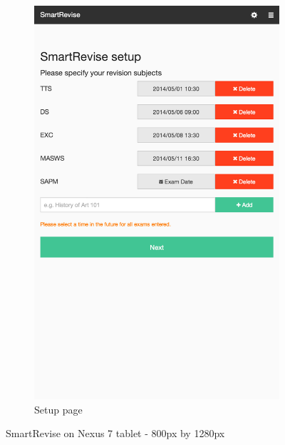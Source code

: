 \documentclass[bsc,frontabs,twoside,singlespacing,parskip]{infthesis}     %
\begin{document}
\begin{figure}
\begin{subfigure}[b]{0.5\textwidth}
			                \includegraphics[width=\textwidth]{setup}
			                \caption{Setup page}
			                \label{fig:setup}
			        \end{subfigure}
			        \caption{SmartRevise on Nexus 7 tablet - 800px by 1280px}\label{fig:setup_and_home}
			\end{figure}
\end{document}
